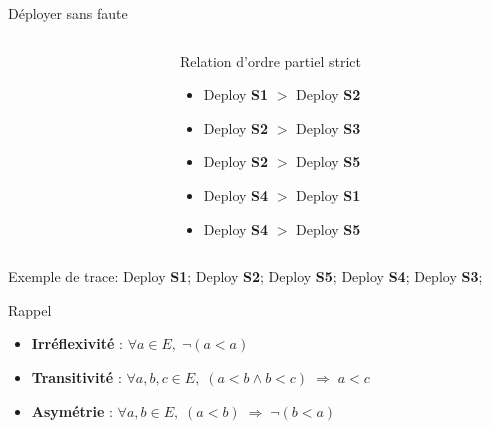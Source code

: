 \documentclass[aspectratio=169,10pt]{beamer}
\begin{document}
\begin{frame}{Déployer sans faute}

\begin{columns}[T,onlytextwidth]
    \begin{column}{.6\linewidth}
       
    \end{column}
    \begin{column}{.4\linewidth}
    \vspace{-0.1in}
      \begin{alertblock}{Relation d'ordre partiel strict}
        \begin{itemize}
            \item Deploy {\bf S1} $>$ Deploy {\bf S2}
            \item Deploy {\bf S2} $>$ Deploy {\bf S3}
            \item Deploy {\bf S2} $>$ Deploy {\bf S5}
            \item Deploy {\bf S4} $>$ Deploy {\bf S1}
            \item Deploy {\bf S4} $>$ Deploy {\bf S5}
        \end{itemize}
      \end{alertblock}
    \end{column}
  \end{columns}
   
\vspace{0.1cm}
   
Exemple de trace: Deploy {\bf S1}; Deploy {\bf S2}; Deploy {\bf S5}; Deploy {\bf S4}; Deploy {\bf S3};

    \vspace{0.3cm}

  \begin{exampleblock}{Rappel}
    \begin{itemize}
      \item \textbf{Irréflexivité} : $\forall a \in E,\; \neg(a < a)$
      \item \textbf{Transitivité} : $\forall a,b,c \in E,\; (a < b \land b < c) \;\Rightarrow\; a < c$
      \item \textbf{Asymétrie} : $\forall a,b \in E,\; (a < b) \;\Rightarrow\; \neg(b < a)$
    \end{itemize}
  \end{exampleblock}
\end{frame}

\end{document}
